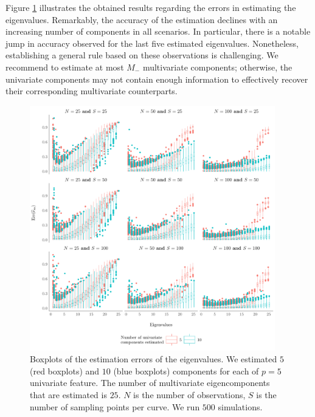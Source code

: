 Figure \ref{fig:ncomp} illustrates the obtained results regarding the errors in estimating the eigenvalues. Remarkably, the accuracy of the estimation declines with an increasing number of components in all scenarios. In particular, there is a notable jump in accuracy observed for the last five estimated eigenvalues. Nonetheless, establishing a general rule based on these observations is challenging. We recommend to estimate at most $M_{-}$ multivariate components; otherwise, the univariate components may not contain enough information to effectively recover their corresponding multivariate counterparts.
\begin{figure}
     \centering
    \includegraphics[width=0.95\textwidth]{figures/ncomp.pdf}
    \caption{Boxplots of the estimation errors of the eigenvalues. We estimated $5$ (red boxplots) and $10$ (blue boxplots) components for each of $p = 5$ univariate feature. The number of multivariate eigencomponents that are estimated is $25$. $N$ is the number of observations, $S$ is the number of sampling points per curve. We run $500$ simulations.}
    \label{fig:ncomp}
\end{figure}
